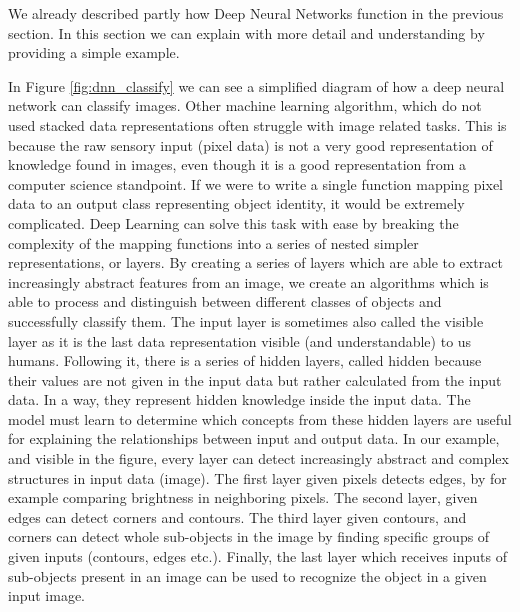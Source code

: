 \documentclass[b5paper]{book}
\begin{document}
We already described partly how Deep Neural Networks function in the previous section. In this section we can explain with more detail and understanding by providing a simple example.

In Figure \ref{fig:dnn_classify} we can see a simplified diagram of how a deep neural network can classify images. Other machine learning algorithm, which do not used stacked data representations often struggle with image related tasks. This is because the raw sensory input (pixel data) is not a very good representation of knowledge found in images, even though it is a good representation from a computer science standpoint. If we were to write a single function mapping pixel data to an output class representing object identity, it would be extremely complicated. Deep Learning can solve this task with ease by breaking the complexity of the mapping functions into a series of nested simpler representations, or layers. By creating a series of layers which are able to extract increasingly abstract features from an image, we create an algorithms which is able to process and distinguish between different classes of objects and successfully classify them. The input layer is sometimes also called the visible layer as it is the last data representation visible (and understandable) to us humans. Following it, there is a series of hidden layers, called hidden because their values are not given in the input data but rather calculated from the input data. In a way, they represent hidden knowledge inside the input data. The model must learn to determine which concepts from these hidden layers are useful for explaining the relationships between input and output data. In our example, and visible in the figure, every layer can detect increasingly abstract and complex structures in input data (image). The first layer given pixels detects edges, by for example comparing brightness in neighboring pixels. The second layer, given edges can detect corners and contours. The third layer given contours, and corners can detect whole sub-objects in the image by finding specific groups of given inputs (contours, edges etc.). Finally, the last layer which receives inputs of sub-objects present in an image can be used to recognize the object in a given input image.
\end{document}
